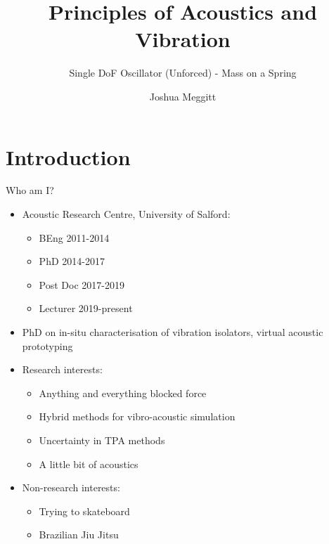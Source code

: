 \documentclass[11pt,aspectratio=169,handout]{beamer}
\title{Principles of Acoustics and \textbf{Vibration}}
\subtitle{Single DoF Oscillator (Unforced) - Mass on a Spring}
\date{}
\author{Joshua Meggitt}
\institute{Acoustics Research Centre, University of Salford}
\begin{document}
\maketitle

\section*{Introduction}
\begin{frame}[c]{Who am I?}
			\begin{itemize}
				\item  Acoustic Research Centre, University of Salford:
				\begin{itemize}
					\item[-] BEng 2011-2014
					\item[-] PhD 2014-2017
					\item[-] Post Doc 2017-2019
					\item[-] Lecturer 2019-present
				\end{itemize}
				\item PhD on in-situ characterisation of vibration isolators, virtual acoustic prototyping
				\item Research interests:
				\begin{itemize}
					\item[-] Anything and everything blocked force
					\item[-] Hybrid methods for vibro-acoustic simulation
					\item[-] Uncertainty in TPA methods
					\item[-] A little bit of acoustics
				\end{itemize}
			\item Non-research interests:
			\begin{itemize}
				\item[-] Trying to skateboard
				\item[-] Brazilian Jiu Jitsu
			\end{itemize}
			\end{itemize}
\end{frame}
\end{document}
